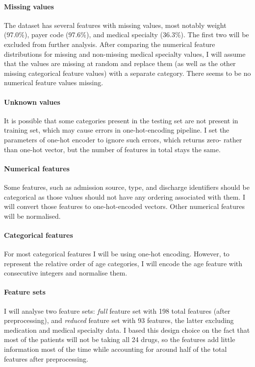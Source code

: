 \documentclass[10pt, twocolumn]{article}
\begin{document}
\paragraph{Missing values} The dataset has several features with missing values, most notably weight (97.0\%), payer code (97.6\%), and medical specialty (36.3\%). The first two will be excluded from further analysis. After comparing the numerical feature distributions for missing and non-missing medical specialty values, I will assume that the values are missing at random and replace them (as well as the other missing categorical feature values) with a separate category. There seems to be no numerical feature values missing.

\paragraph{Unknown values} It is possible that some categories present in the testing set are not present in training set, which may cause errors in one-hot-encoding pipeline. I set the parameters of one-hot encoder to ignore such errors, which returns zero- rather than one-hot vector, but the number of features in total stays the same.

\paragraph{Numerical features} Some features, such as admission source, type, and discharge identifiers should be categorical as those values should not have any ordering associated with them. I will convert those features to one-hot-encoded vectors. Other numerical features will be normalised.

\paragraph{Categorical features} For most categorical features I will be using one-hot encoding. However, to represent the relative order of age categories, I will encode the age feature with consecutive integers and normalise them.

\paragraph{Feature sets} I will analyse two feature sets: \textit{full} feature set with 198 total features (after preprocessing), and \textit{reduced} feature set with 93 features, the latter excluding medication and medical specialty data. I based this design choice on the fact that most of the patients will not be taking all 24 drugs, so the features add little information most of the time while accounting for around half of the total features after preprocessing.
\end{document}

